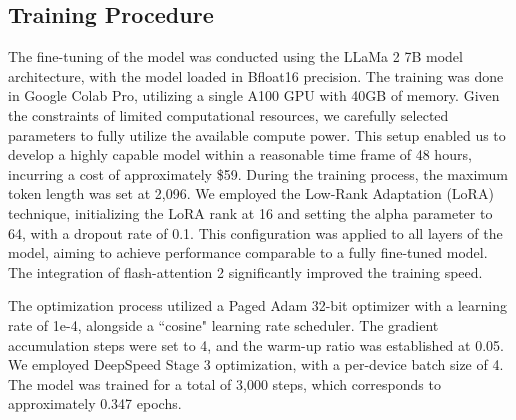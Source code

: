 \subsection{\namel Training Procedure}
The fine-tuning of the \texttt{\namel} model was conducted using the LLaMa 2 7B model architecture, with the model loaded in Bfloat16 precision. The training was done in Google Colab Pro, utilizing a single A100 GPU with 40GB of memory. Given the constraints of limited computational resources, we carefully selected parameters to fully utilize the available compute power. This setup enabled us to develop a highly capable model within a reasonable time frame of 48 hours, incurring a cost of approximately \$59. During the training process, the maximum token length was set at 2,096. We employed the Low-Rank Adaptation (LoRA) technique, initializing the LoRA rank at 16 and setting the alpha parameter to 64, with a dropout rate of 0.1. This configuration was applied to all layers of the model, aiming to achieve performance comparable to a fully fine-tuned model. The integration of flash-attention 2 significantly improved the training speed.

The optimization process utilized a Paged Adam 32-bit optimizer with a learning rate of 1e-4, alongside a ``cosine" learning rate scheduler. The gradient accumulation steps were set to 4, and the warm-up ratio was established at 0.05. We employed DeepSpeed Stage 3 optimization, with a per-device batch size of 4. The model was trained for a total of 3,000 steps, which corresponds to approximately 0.347 epochs.


